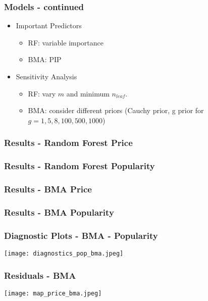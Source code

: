 \documentclass{beamer}
\begin{document}
\begin{frame}
\frametitle{Models - continued}
\begin{itemize}
	\item Important Predictors
	\begin{itemize}
		\item RF: variable importance
		
		\item BMA: PIP
	\end{itemize}
	\item Sensitivity Analysis
	\begin{itemize}
		\item RF: vary $m$ and minimum $n_{leaf}$.
		\item BMA: consider different priors (Cauchy prior, g prior for $g = 1,5,8,100,500,1000$)
	\end{itemize}
\end{itemize}

\end{frame}


\begin{frame}
\frametitle{Results - Random Forest Price}

\end{frame}

\begin{frame}
\frametitle{Results - Random Forest Popularity}

\end{frame}

\begin{frame}
\frametitle{Results - BMA Price}


\end{frame}

\begin{frame}
\frametitle{Results - BMA Popularity}
\begin{center}
	
\end{center}

\end{frame}


\begin{frame}
\frametitle{Diagnostic Plots - BMA - Popularity}
\begin{center}
	\texttt{[image: diagnostics\_pop\_bma.jpeg]}	
\end{center}
\end{frame}



\begin{frame}
\frametitle{Residuals - BMA}
\texttt{[image: map\_price\_bma.jpeg]}
\end{frame} 
\end{document}
